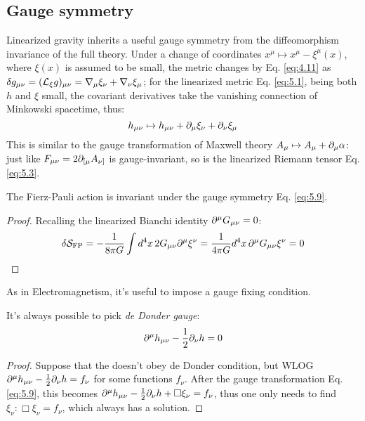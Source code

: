 \subsection{Gauge symmetry}

Linearized gravity inherits a useful gauge symmetry from the diffeomorphism invariance of the full theory. Under a change of coordinates $ x^\mu \mapsto x^\mu - \xi^\mu(x) $, where $ \xi(x) $ is assumed to be small, the metric changes by Eq. \ref{eq:4.11} as $ \delta g_{\mu \nu} = (\mathcal{L}_\xi g)_{\mu \nu} = \nabla_\mu \xi_\nu + \nabla_\nu \xi_\mu $; for the linearized metric Eq. \ref{eq:5.1}, being both $ h $ and $ \xi $ small, the covariant derivatives take the vanishing connection of Minkowski spacetime, thus:
\begin{equation}
  h_{\mu \nu} \mapsto h_{\mu \nu} + \partial_\mu \xi_\nu + \partial_\nu \xi_\mu
  \label{eq:5.9}
\end{equation}
This is similar to the gauge transformation of Maxwell theory $ A_\mu \mapsto A_\mu + \partial_\mu \alpha $: just like $ F_{\mu \nu} = 2 \partial_{[\mu} A_{\nu]} $ is gauge-invariant, so is the linearized Riemann tensor Eq. \ref{eq:5.3}.

\begin{proposition}
  The Fierz-Pauli action is invariant under the gauge symmetry Eq. \ref{eq:5.9}.
\end{proposition}
\begin{proof}
  Recalling the linearized Bianchi identity $ \partial^\mu G_{\mu \nu} = 0 $:
  \begin{equation*}
    \delta \mathcal{S}_{\text{FP}} = - \frac{1}{8\pi G} \int d^4 x\, 2 G_{\mu \nu} \partial^\mu \xi^\nu = \frac{1}{4\pi G} d^4 x\, \partial^\mu G_{\mu \nu} \xi^\nu = 0
  \end{equation*}
\end{proof}

As in Electromagnetism, it's useful to impose a gauge fixing condition.

\begin{proposition}
  It's always possible to pick \textit{de Donder gauge}:
  \begin{equation}
    \partial^\mu h_{\mu \nu} - \frac{1}{2} \partial_\nu h = 0
    \label{eq:5.10}
  \end{equation}
\end{proposition}
\begin{proof}
  Suppose that the doesn't obey de Donder condition, but WLOG $ \partial^\mu h_{\mu \nu} - \frac{1}{2} \partial_\nu h = f_\nu $ for some functions $ f_\nu $. After the gauge transformation Eq. \ref{eq:5.9}, this becomes $ \partial^\mu h_{\mu \nu} - \frac{1}{2} \partial_\nu h + \Box \xi_\nu = f_\nu $, thus one only needs to find $ \xi_\nu : \Box \xi_\nu = f_\nu $, which always has a solution.
\end{proof}


